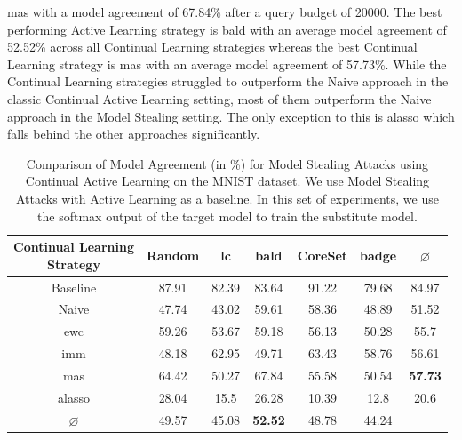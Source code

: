 \gls{mas} with a model agreement of 67.84\% after a query budget of 20000. The best performing Active Learning strategy is \gls{bald} with an average model agreement of 52.52\% across all Continual Learning strategies whereas the best Continual Learning strategy is \gls{mas} with an average
model agreement of 57.73\%. While the Continual Learning strategies struggled to outperform the Naive approach in the classic Continual Active Learning setting, most of them outperform the Naive approach in the Model Stealing setting. The only exception to this is \gls{alasso} which
falls behind the other approaches significantly. \par 

\begin{table}[h]
    \centering
    \begin{tabular}{c | c c c c c | c } 
        \hline
        \diagbox[width=11em]{Active \\ Learning Strategy}{Continual Learning \\ Strategy} & Random & \gls{lc} & \gls{bald} & CoreSet & \gls{badge} & $\varnothing$\\ 
        \hline 
        Baseline & 87.91 & 82.39 & 83.64 & 91.22 & 79.68 & 84.97\\
        \hline
        Naive & 47.74 & 43.02 & 59.61 & 58.36 & 48.89 & 51.52\\
        \gls{ewc} &  59.26 & 53.67 & 59.18 & 56.13 & 50.28 & 55.7\\
        \gls{imm} & 48.18 & 62.95 & 49.71 & 63.43 & 58.76 & 56.61 \\
        \gls{mas} &  64.42 & 50.27 & 67.84 & 55.58 & 50.54 & \textbf{57.73}\\
        \gls{alasso} & 28.04 & 15.5 & 26.28 & 10.39 & 12.8 & 20.6\\
        \hline
        $\varnothing$ & 49.57 & 45.08 & \textbf{52.52} & 48.78 & 44.24 & \\
        \hline
    \end{tabular}
    \caption[Model agreement of Continual Learning strategies on MNIST using softmax output]{Comparison of Model Agreement (in \%) for Model Stealing Attacks using Continual Active Learning on the MNIST dataset. We use Model Stealing Attacks with Active Learning as a baseline.
    In this set of experiments, we use the softmax output of the target model to train the substitute model.}
    \label{fig:ModelStealingMNISTSoftmax}
\end{table}

